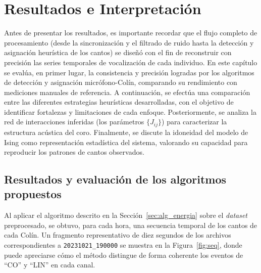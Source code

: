 \chapter{Resultados e Interpretación}\label{chapter:Results}

Antes de presentar los resultados, es 
importante recordar que el flujo completo de procesamiento 
(desde la sincronización y el filtrado de ruido hasta la 
detección y asignación heurística de los cantos) se diseñó con 
el fin de reconstruir con precisión las series temporales de 
vocalización de cada individuo. En este capítulo se evalúa, en 
primer lugar, la consistencia y precisión logradas por los 
algoritmos de detección y asignación micrófono-Colín, 
comparando su rendimiento 
con mediciones manuales de referencia. A continuación, se 
efectúa una comparación entre las diferentes 
estrategias heurísticas desarrolladas, con el objetivo de 
identificar fortalezas y limitaciones de cada enfoque. 
Posteriormente, se analiza la red de interacciones inferidas 
(los parámetros \(\{J_{ij}\}\)) para caracterizar la estructura 
acústica del coro. 
Finalmente, se discute la idoneidad del modelo de Ising como 
representación estadística del sistema, valorando su capacidad 
para reproducir los patrones de cantos observados.  


\section{Resultados y evaluación de los algoritmos propuestos}
\label{sec:res_asignacion}



Al aplicar el algoritmo descrito en la Sección~\ref{sec:alg_energia} sobre 
el 
\textit{dataset} preprocesado, se obtuvo, para cada hora, una 
secuencia temporal de los cantos de cada Colín. 
Un fragmento representativo de diez 
segundos de los archivos correspondientes a \texttt{20231021\_190000}
se muestra en la Figura~\ref{fig:seq}, donde puede 
apreciarse cómo el método distingue de forma coherente los 
eventos de “CO” y “LIN” en cada canal.

